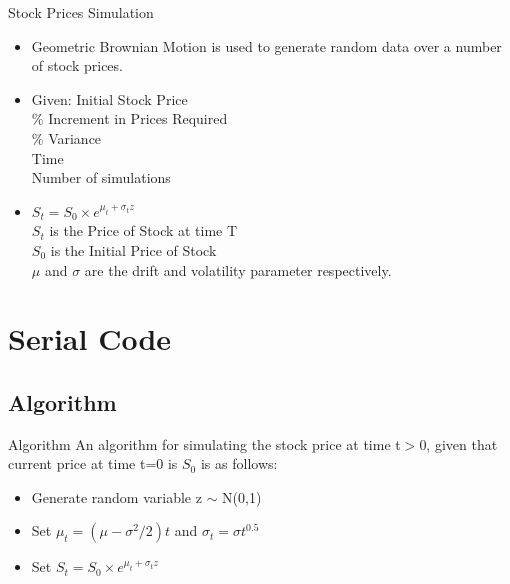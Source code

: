 \documentclass{beamer}
\begin{document}
\begin{frame}{Stock Prices Simulation}
  \begin{itemize}
  \item{
    Geometric Brownian Motion is used to generate random data over a number of stock prices. 
  }
  \item {   
    Given: Initial Stock Price \\
           \hspace{11mm}\small{{\%}} Increment in Prices Required\\
           \hspace{11mm}\small{{\%}} Variance\\
           \hspace{11mm}Time\\
           \hspace{11mm}Number of simulations\\
  }
  \item{
       $S_{t}=S_{0} \times e^{\mu_{t} + \sigma_{t} z}$ \\
       $S_{t}$ is the Price of Stock at time T \\        
       $S_{0}$ is the Initial Price of Stock \\
       ${\mu}$ and ${\sigma}$ are the drift and volatility parameter respectively.\\
  }
  \end{itemize}
\end{frame}
\section{Serial Code}

\subsection{Algorithm}

\begin{frame}{Algorithm}{}
An algorithm for simulating the stock price at time t$>$0, given that current price at time t=0 is $S_{0}$ is as follows:\\
  
  \begin{itemize}
   
  \item {
    Generate random variable z $\sim$ N(0,1)
    
  }
  \item {
    Set $\mu_{t}=(\mu - \sigma^{2}/2)t$ and $\sigma_{t}=\sigma t^{0.5}$
  }
  \item {
  Set $S_{t}=S_{0} \times e^{\mu_{t} + \sigma_{t} z}$
   }
  \end{itemize}
\end{frame}
\end{document}
